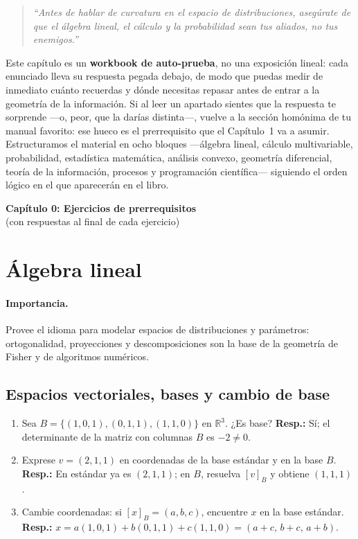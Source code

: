 
\begin{quotation}
	\itshape
	``Antes de hablar de curvatura en el espacio de distribuciones, asegúrate de que el álgebra lineal, el cálculo y la probabilidad sean tus aliados, no tus enemigos.''
\end{quotation}

	\bigskip
	\noindent
	Este capítulo es un \textbf{workbook de auto-prueba}, no una exposición lineal: cada enunciado lleva su respuesta pegada debajo, de modo que puedas medir de inmediato cuánto recuerdas y dónde necesitas repasar antes de entrar a la geometría de la información. Si al leer un apartado sientes que la respuesta te sorprende ---o, peor, que la darías distinta---, vuelve a la sección homónima de tu manual favorito: ese hueco es el prerrequisito que el Capítulo~1 va a asumir. Estructuramos el material en ocho bloques ---álgebra lineal, cálculo multivariable, probabilidad, estadística matemática, análisis convexo, geometría diferencial, teoría de la información, procesos y programación científica--- siguiendo el orden lógico en el que aparecerán en el libro.

	\begin{center}
		{\LARGE \textbf{Capítulo 0: Ejercicios de prerrequisitos}}\\[4pt]
		{\large (con respuestas al final de cada ejercicio)}
	\end{center}
	
	\section{Álgebra lineal}
	\paragraph{Importancia.} Provee el idioma para modelar espacios de distribuciones y parámetros: ortogonalidad, proyecciones y descomposiciones son la base de la geometría de Fisher y de algoritmos numéricos.
	
	\subsection*{Espacios vectoriales, bases y cambio de base}
	\begin{enumerate}
		\item Sea $B=\{(1,0,1),(0,1,1),(1,1,0)\}$ en $\mathbb R^3$. ¿Es base? \textbf{Resp.:} Sí; el determinante de la matriz con columnas $B$ es $-2\ne0$.
		\item Exprese $v=(2,1,1)$ en coordenadas de la base estándar y en la base $B$. \textbf{Resp.:} En estándar ya es $(2,1,1)$; en $B$, resuelva $[v]_B$ y obtiene $(1,1,1)$.
		\item Cambie coordenadas: si $[x]_B=(a,b,c)$, encuentre $x$ en la base estándar. \textbf{Resp.:} $x=a(1,0,1)+b(0,1,1)+c(1,1,0)=(a+c,\,b+c,\,a+b)$.
	\end{enumerate}
	
